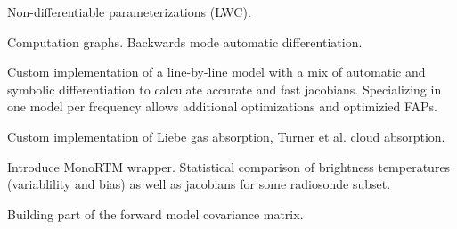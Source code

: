     \stopsubsection

    \startsubsection[title=Symbolic Differentiation]

        Non-differentiable parameterizations (LWC).

    \stopsubsection

    \startsubsection[title=Automatic Differentiation]

        Computation graphs. Backwards mode automatic differentiation.
        
    \stopsubsection

\stopsection


\startsection[title=A Numerical Model]

    Custom implementation of a line-by-line model with a mix of automatic and
    symbolic differentiation to calculate accurate and fast jacobians.
    Specializing in one model per frequency allows additional optimizations
    and optimizied FAPs.

    \startsubsection[title=Implementation]

        Custom implementation of Liebe gas absorption, Turner et al. cloud
        absorption.

    \stopsubsection

    \startsubsection[title=Comparison with MonoRTM]

        Introduce MonoRTM wrapper. Statistical comparison of brightness
        temperatures (variablility and bias) as well as jacobians for some
        radiosonde subset.

    \stopsubsection

    \startsubsection[title={Characterizing Errors},reference={ch:rtm_errors}]

        Building part of the forward model covariance matrix.

    \stopsubsection

\stopsection

